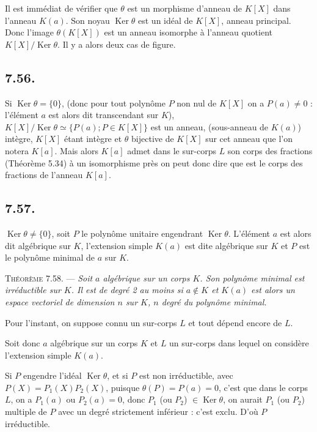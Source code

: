 Il est immédiat de vérifier que $\theta$ est un morphisme d'anneau de $K[X]$ dans l'anneau $K(a)$. Son noyau $\operatorname{Ker}\theta$ est un idéal de $K[X]$, anneau principal. Donc l'image $\theta(K[X])$ est un anneau isomorphe à l'anneau quotient $K[X]/\operatorname{Ker}\theta$. Il y a alors deux cas de figure.

\subsection*{7.56.}

Si $\operatorname{Ker}\theta=\{0\}$, (donc pour tout polynôme $P$ non nul de $K[X]$ on a $P(a)\ne0$ : l'élément $a$ est alors dit transcendant sur $K$), $K[X]/\operatorname{Ker}\theta\simeq\{P(a);P\in K[X]\}$ est un anneau, (sous-anneau de $K(a)$) intègre, $K[X]$ étant intègre et $\theta$ bijective de $K[X]$ sur cet anneau que l'on notera $K[a]$. Mais alors $K[a]$ admet dans le sur-corps $L$ son corps des fractions (Théorème 5.34) à un isomorphisme près on peut donc dire que  est le corps des fractions de l'anneau $K[a]$.

\subsection*{7.57.}

 $\operatorname{Ker}\theta\ne\{0\}$, soit $P$ le polynôme unitaire engendrant $\operatorname{Ker}\theta$. L'élément $a$ est alors dit algébrique sur $K$, l'extension simple $K(a)$ est dite algébrique sur $K$ et $P$ est le polynôme minimal de $a$ sur $K$.

\medskip\noindent\textsc{Théorème 7.58.} --- \emph{Soit $a$ algébrique sur un corps $K$. Son polynôme minimal est irréductible sur $K$. Il est de degré 2 au moins si $a\notin K$ et $K(a)$ est alors un espace vectoriel de dimension $n$ sur $K$, $n$ degré du polynôme minimal.}

Pour l'instant, on suppose connu un sur-corps $L$ et tout dépend encore de $L$.

Soit donc $a$ algébrique sur un corps $K$ et $L$ un sur-corps dans lequel on considère l'extension simple $K(a)$.

Si $P$ engendre l'idéal $\operatorname{Ker}\theta$, et si $P$ est non irréductible, avec $P(X)=P_1(X)P_2(X)$, puisque $\theta(P)=P(a)=0$, c'est que dans le corps $L$, on a $P_1(a)$ ou $P_2(a)=0$, donc $P_1$ (ou $P_2$) $\in\operatorname{Ker}\theta$, on aurait $P_1$ (ou $P_2$) multiple de $P$ avec un degré strictement inférieur : c'est exclu. D'où $P$ irréductible.

